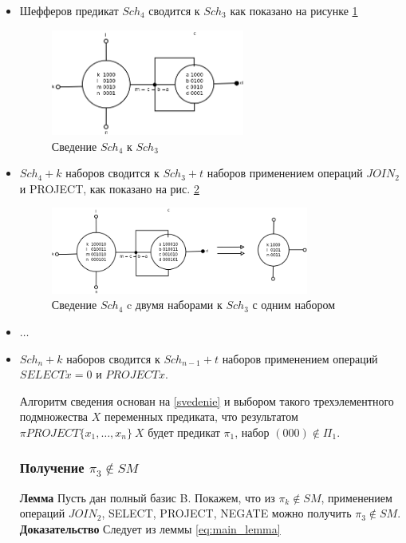 \documentclass[12pt]{article}
\begin{document}
\begin{itemize}
\item Шефферов предикат $Sch_4$ сводится к $Sch_3$ как показано на рисунке \ref{fig:4to3}
\begin{figure}[htb]
\centering
\includegraphics[width=0.6\textwidth]{4to3.png}
\caption{Сведение $Sch_4$ к $Sch_3$ }
\label{fig:4to3}
\end{figure}


\item $Sch_4 + k$ наборов сводится к $Sch_3 + t$ наборов применением операций $JOIN_2$ и PROJECT, как показано на рис.
\ref{fig:4_2to3_1}
\begin{figure}[htb]
\centering
\includegraphics[width=0.8\textwidth]{4_2to3_1.png}
\caption{Сведение $Sch_4$ c двумя наборами к $Sch_3$ с одним набором}
\label{fig:4_2to3_1}
\end{figure}
\item $\ldots$
\item $Sch_n + k$ наборов сводится к $Sch_{n-1} + t$ наборов применением операций $SELECT x=0$ и $PROJECT x$.

Алгоритм сведения основан на \ref{svedenie} и 
выбором такого трехэлементного подмножества $X$ переменных предиката, что результатом 
$\pi PROJECT \{x_1, \dots, x_n\} \ X$ будет предикат $\pi_1$, набор $ (000) \notin \Pi_1$.

\subsubsection {Получение $\pi_3 \notin SM$}
\textbf{Лемма}
Пусть дан полный базис B. Покажем, что из $\pi_k \notin SM$, применением операций $JOIN_2$, SELECT, PROJECT, NEGATE
можно получить $\pi_3 \notin SM$.
\textbf{Доказательство} Следует из леммы \ref{eq:main_lemma} 

\end{itemize}
\end{document}
